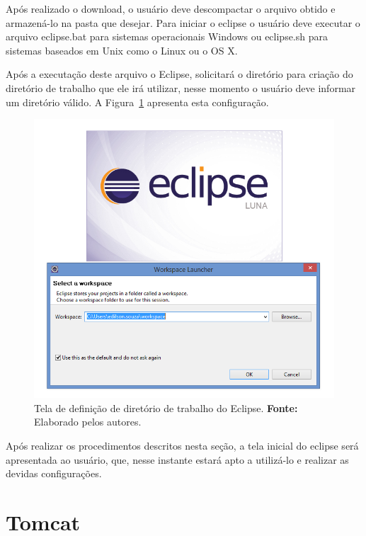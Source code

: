 Após realizado o download, o usuário deve descompactar o arquivo obtido e armazená-lo na pasta que desejar. Para iniciar o eclipse o usuário deve executar o arquivo eclipse.bat para sistemas operacionais Windows ou eclipse.sh para sistemas baseados em Unix como o Linux ou o OS X.

Após a executação deste arquivo o Eclipse, solicitará o diretório para criação do diretório de trabalho que ele irá utilizar, nesse momento o usuário deve informar um diretório válido. A Figura~\ref{fig:ap2:eclipse_selecionar_workspace} apresenta esta configuração.

\captionsetup[figure]{list=no}
\begin{figure}[h!]
	\centerline{\includegraphics[scale=0.5]{./imagens/apendices/eclipse-selecionar-workspace.png}}
	\caption[Tela de definição de diretório de trabalho do Eclipse.]
	{Tela de definição de diretório de trabalho do Eclipse. \textbf{Fonte:} Elaborado pelos autores.}
	\label{fig:ap2:eclipse_selecionar_workspace}
\end{figure}

Após realizar os procedimentos descritos nesta seção, a tela inicial do eclipse será apresentada ao usuário, que, nesse instante estará apto a utilizá-lo e realizar as devidas configurações.

\section*{Tomcat}

